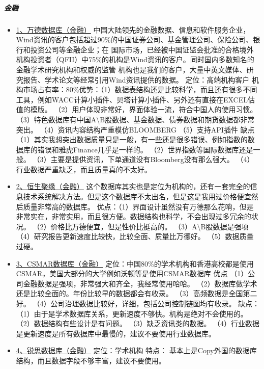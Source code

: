 \documentclass[letterpaper,10pt,english]{sphinxmanual}
\begin{document}
\subparagraph{金融}
\label{opendatasource:}\label{opendatasource:id9}\begin{itemize}
\item {} 
\href{http://www.wind.com.cn/}{1、万德数据库（金融）}
中国大陆领先的金融数据、信息和软件服务企业，Wind资讯的客户包括超过90\%的中国证券公司、基金管理公司、保险公司、银行和投资公司等金融企业；在 国际市场，已经被中国证监会批准的合格境外机构投资者（QFII）中75\%的机构是Wind资讯的客户。同时国内多数知名的金融学术研究机构和权威的监管 机构也是我们的客户，大量中英文媒体、研究报告、学术论文等经常引用Wind资讯提供的数据。
定位：高端机构客户
机构市场占有率：80\%优势：（1）数据表结构还是比较科学，而且还有很多不同工具，例如WACC计算小插件、贝塔计算小插件、另外还有直接在EXCEL估值的模版。
（2）用户体现非常好，界面体验一流，符合中国人的使用习惯。
（3）特色数据库有中国A\textbackslash{}B股数据、基金数据、债券数据和期货数据都非常突出。
（4）资讯内容结构严重模仿BLOOMBERG
（5）支持API插件
缺点
（1）其实我想突出数据质量只是一般，有一些还是很多错误、例如指数的数据库的错误和雅虎Finance几乎是一样的。
（2）世界指数等国际数据库还是一般。
（3）主要是提供资讯，下单通道没有Bloomberg没有那么强大。
（4）行业数据严重缺乏，而且质量真的不太好。

\item {} 
\href{http://www.gildata.com.cn/}{2、恒生聚缘（金融）}
这个数据库其实也是定位为机构的，还有一套完全的信息技术系统解决方法。但是这个数据库不太出名，但是这是我用过价格便宜然后质量非常高的数据库。
优点：（1）界面设计虽然没有万德那么花哨，但是非常实在，非常实用，而且很方便。数据结构也科学，不会出现过多冗余的状况。
（2）价格比万德便宜，但是性价比挺高的。
（3）A\textbackslash{}B股数据是强项
（4）研究报告更新速度比较快，比较全面、质量比万德好。
（5）数据质量过硬。

\item {} 
\href{http://www.gtarsc.com/}{3、CSMAR数据库（金融）}
定位：中国80\%的学术机构和香港高校都是使用CSMAR，美国大部分的大学例如沃顿等是使用CSMAR数据库
优点
（1）公司金融数据是强项，非常强大和齐全，我经常使用哈哈。
（2）数据库做学术还是比较全面的。年份比较早的数据都会有收录。
（3）高频数据是全国第二好。
（4）公司治理数据比较好，详细，包括公司控制链图均有收录。
缺点：
（1）由于是学术数据库关系，更新速度不够快。机构是绝对不会使用的。
（2）数据结构有些设计是有问题。
（3）缺乏资讯类的数据。
（4）行业数据是更新速度是所有数据库中最慢的，建议不要使用行业数据库。

\item {} 
\href{http://www.resset.cn/cn/}{4、锐思数据库（金融）}
定位：学术机构
特点：
基本上是Copy外国的数据库结构，而且数据字段不够丰富，建议不要使用。


\end{itemize}
\end{document}
